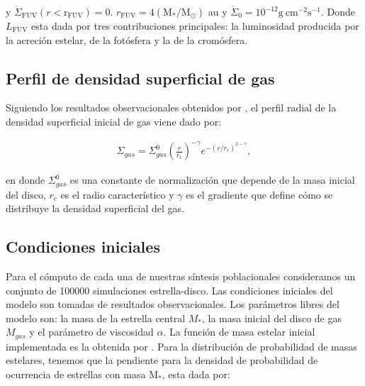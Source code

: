 \documentclass[baaa]{baaa}
\begin{document}
y $\dot{ \Sigma }_{ \mathrm{FUV} }(r<\mathrm{r}_{\mathrm{FUV}}) = 0$. $r_{\mathrm{FUV}} = 4 (\mathrm{M}_*/ \mathrm{M}_{\odot})$ au y $\dot{\Sigma}_{0} = 10^{-12}\mathrm{g}~\mathrm{cm}^{-2}\text{s}^{-1}$. Donde $L_{\mathrm{FUV}}$ esta dada por tres contribuciones principales: la luminosidad producida por la acreción estelar, de la fot\'osfera y la de la crom\'osfera.





\subsection{Perfil de densidad superficial de gas}



Siguiendo los resultados observacionales obtenidos por \cite{Andrews_2010}, el perfil radial de la densidad superficial inicial de gas viene dado por:

\begin{align}

    \Sigma_{gas} = \Sigma_{gas}^{0} \left(\frac{r}{r_c}\right)^{-\gamma} e^{-(r/r_c)^{2-\gamma}},

    \label{eq:densi_inicial}

\end{align}

en donde $\Sigma_{gas}^{0}$ es una constante de normalización que depende de la masa inicial del disco, $r_{c}$ es el radio característico y $\gamma$ es el gradiente que define c\'omo se distribuye la densidad superficial del gas.



\subsection{Condiciones iniciales}

Para el c\'omputo de cada una de nuestras síntesis  poblacionales consideramos un conjunto de 100000 simulaciones estrella-disco. Las condiciones iniciales del modelo son tomadas de resultados observacionales. Los parámetros libres del modelo son: la masa de la estrella central $M_{*}$, la masa inicial del disco de gas $M_{gas}$ y el par\'ametro de viscosidad $\alpha$. La función de masa estelar inicial implementada es la obtenida por \cite{kroupa2001}. Para la distribución de probabilidad de masas estelares, tenemos que la pendiente para la densidad de probabilidad de ocurrencia de estrellas con masa $\text{M}_{*}$, esta dada por:
\end{document}
